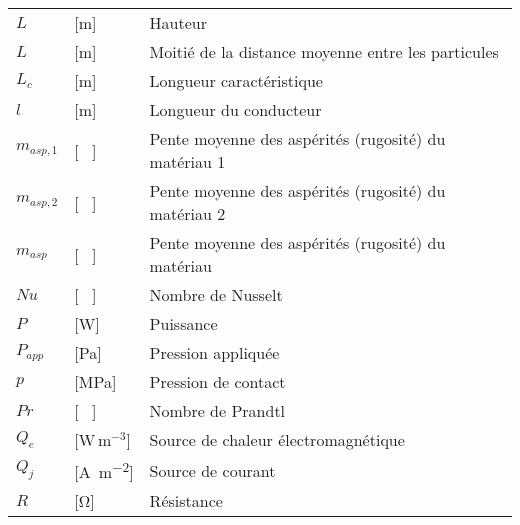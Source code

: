 \begin{longtable}{l p{2.5cm} p{4in}}
	$L$              & [\si{\metre}]                                       & Hauteur                                                      \\
	$L$              & [\si{\metre}]                                       & Moitié de la distance moyenne entre les particules           \\
	$L_c$            & [\si{\metre}]                                       & Longueur caractéristique                                     \\
	$l$              & [\si{\metre}]                                       & Longueur du conducteur                                       \\
	$m_{asp,1}$      & [ \ ]                                               & Pente moyenne des aspérités (rugosité) du matériau 1         \\
	$m_{asp,2}$      & [ \ ]                                               & Pente moyenne des aspérités (rugosité) du matériau 2         \\
	$m_{asp}$        & [ \ ]                                               & Pente moyenne des aspérités (rugosité) du matériau           \\
	$Nu$             & [ \ ]                                               & Nombre de Nusselt                                            \\
	$P$              & [\si{\watt}]                                        & Puissance                                                    \\
	$P_{app}$        & [\si{\pascal}]                                      & Pression appliquée                                           \\
	$p$              & [\si{\mega\pascal}]                                 & Pression de contact                                          \\
	$Pr$             & [ \ ]                                               & Nombre de Prandtl                                            \\
	$Q_e$            & [W\,m$^{-3}$]                                       & Source de chaleur électromagnétique                          \\
	$Q_j$            & [\si{\ampere\per\square\metre}]                     & Source de courant                                            \\
	$R$              & [\si{\ohm}]                                         & Résistance                                                   \\

\end{longtable}
